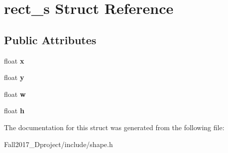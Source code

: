 \hypertarget{structrect__s}{}\section{rect\+\_\+s Struct Reference}
\label{structrect__s}
\subsection*{Public Attributes}
\begin{DoxyCompactItemize}
\item 
\mbox{\label{structrect__s_af1ef1f7888832e94de816a9708876651}} 
float {\bfseries x}
\item 
\mbox{\label{structrect__s_a8f3235a699528bbd8a0564eb5ddc9f4c}} 
float {\bfseries y}
\item 
\mbox{\label{structrect__s_ad5e04929c55f2b60b4d50cf024a0c8e1}} 
float {\bfseries w}
\item 
\mbox{\label{structrect__s_a95ae4b3ae0b396657aad3322a6dfb27e}} 
float {\bfseries h}
\end{DoxyCompactItemize}


The documentation for this struct was generated from the following file\+:\begin{DoxyCompactItemize}
\item 
Fall2017\+\_\+Dproject/include/shape.\+h\end{DoxyCompactItemize}
